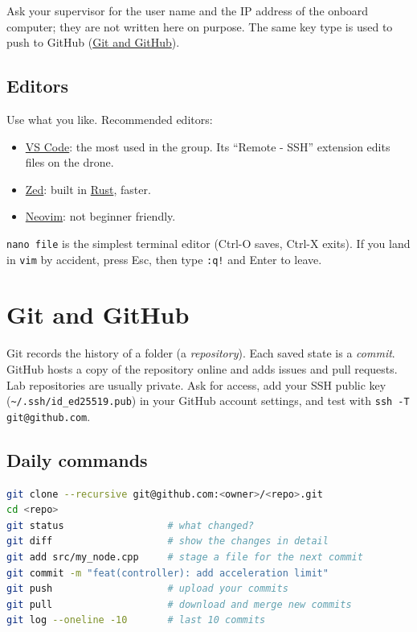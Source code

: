 \documentclass[11pt,a4paper]{article}
\begin{document}
Ask your supervisor for the user name and the IP address of the
onboard computer; they are not written here on purpose. The same key
type is used to push to GitHub (\hyperref[git-and-github]{Git and
	GitHub}).

\subsection{Editors}\label{editors}

Use what you like. Recommended editors:

\begin{itemize}
	\item
	      \href{https://code.visualstudio.com}{VS Code}: the most used in the
	      group. Its ``Remote - SSH'' extension edits files on the drone.
	\item
	      \href{https://zed.dev}{Zed}: built in \href{https://www.rust-lang.org}{Rust}, faster.
	\item
	      \href{https://neovim.io}{Neovim}: not beginner friendly.
\end{itemize}

\texttt{nano file} is the simplest terminal editor (Ctrl-O saves,
Ctrl-X exits). If you land in \texttt{vim} by accident, press Esc, then
type \texttt{:q!} and Enter to leave.

\section{Git and GitHub}\label{git-and-github}

Git records the history of a folder (a \emph{repository}). Each saved
state is a \emph{commit}. GitHub hosts a copy of the repository online
and adds issues and pull requests. Lab repositories are usually private.
Ask for access, add your SSH public key
(\texttt{\textasciitilde{}/.ssh/id\_ed25519.pub}) in your GitHub account
settings, and test with \texttt{ssh -T git@github.com}.

\subsection{Daily commands}\label{daily-commands}

\begin{lstlisting}[language=bash]
git clone --recursive git@github.com:<owner>/<repo>.git
cd <repo>
git status                  # what changed?
git diff                    # show the changes in detail
git add src/my_node.cpp     # stage a file for the next commit
git commit -m "feat(controller): add acceleration limit"
git push                    # upload your commits
git pull                    # download and merge new commits
git log --oneline -10       # last 10 commits
\end{lstlisting}
\end{document}

